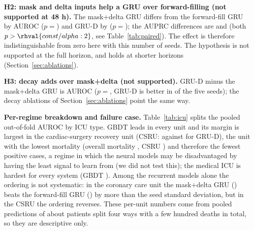 \textbf{H2: mask and delta inputs help a GRU over forward-filling (not supported at 48 h).} The mask+delta GRU differs from the forward-fill GRU by  AUROC ($p=$) and GRU-D by  ($p=$); the AUPRC differences are  and  (both $p>\rhval{const/alpha:2}$, see Table~\ref{tab:paired}). The effect is therefore indistinguishable from zero here with this number of seeds. The hypothesis is not supported at the full horizon, and holds at shorter horizons (Section~\ref{sec:ablations}).

\textbf{H3: decay adds over mask+delta (not supported).} GRU-D minus the mask+delta GRU is  AUROC ($p=$, GRU-D is better in  of the five seeds); the decay ablations of Section~\ref{sec:ablations} point the same way.

\textbf{Per-regime breakdown and failure case.} Table~\ref{tab:icu} splits the pooled out-of-fold AUROC by ICU type. GBDT leads in every unit and its margin is largest in the cardiac-surgery recovery unit (CSRU:  against  for GRU-D), the unit with the lowest mortality (overall mortality , CSRU ) and therefore the fewest positive cases, a regime in which the neural models may be disadvantaged by having the least signal to learn from (we did not test this); the medical ICU is hardest for every system (GBDT ). Among the recurrent models alone the ordering is not systematic: in the coronary care unit the mask+delta GRU () beats the forward-fill GRU () by more than the seed standard deviation, but in the CSRU the ordering reverses. These per-unit numbers come from pooled predictions of about  patients split four ways with a few hundred deaths in total, so they are descriptive only.

